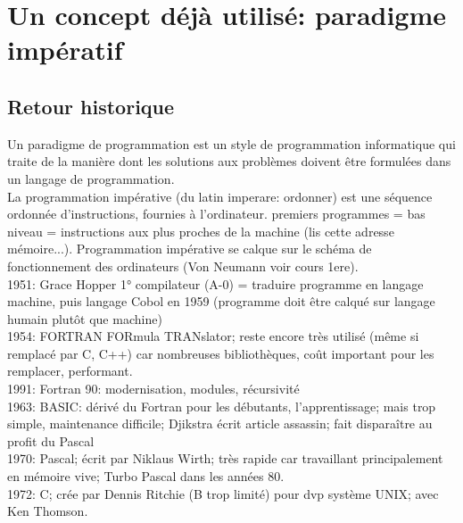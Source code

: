 \documentclass[a4paper,11pt]{article}
\begin{document}
\begin{Form}
\begin{center}
\end{center}
\section{Un concept déjà utilisé: paradigme impératif}
\begin{commentprof}
\subsection*{Retour historique}
Un paradigme de programmation est un style de programmation informatique qui traite de la manière dont les solutions aux problèmes doivent être formulées dans un langage de programmation.\\
La programmation impérative (du latin imperare: ordonner) est une séquence ordonnée d'instructions, fournies à l'ordinateur. premiers programmes = bas niveau = instructions aux plus proches de la machine (lis cette adresse mémoire...). Programmation impérative se calque sur le schéma de fonctionnement des ordinateurs (Von Neumann voir cours 1ere).\\1951: Grace Hopper 1° compilateur (A-0) = traduire programme en langage machine, puis langage Cobol en 1959 (programme doit être calqué sur langage humain plutôt que machine)\\1954: FORTRAN FORmula TRANslator; reste encore très utilisé (même si remplacé par C, C++) car nombreuses bibliothèques, coût important pour les remplacer, performant.\\1991: Fortran 90: modernisation, modules, récursivité\\1963: BASIC: dérivé du Fortran pour les débutants, l'apprentissage; mais trop simple, maintenance difficile; Djikstra écrit article assassin; fait disparaître au profit du Pascal\\1970: Pascal; écrit par Niklaus Wirth; très rapide car travaillant principalement en mémoire vive; Turbo Pascal dans les années 80.\\1972: C; crée par Dennis Ritchie (B trop limité) pour dvp système UNIX; avec Ken Thomson.
\end{commentprof}

\end{Form}
\end{document}
